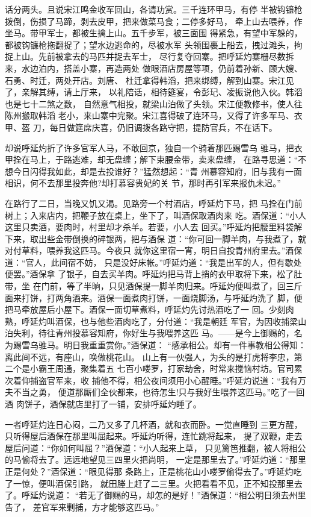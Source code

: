 话分两头。且说宋江鸣金收军回山，各请功赏。三千连环甲马，有停
半被钩镰枪拨倒，伤损了马蹄，剥去皮甲，把来做菜马食；二停多好马，
牵上山去喂养，作坐马。带甲军士，都被生擒上山。五千步军，被三面围
得紧急，有望中军躲的，都被钩镰枪拖翻捉了；望水边逃命的，尽被水军
头领围裹上船去，拽过滩头，拘捉上山。先前被拿去的马匹并捉去军士，
尽行复夺回寨。把呼延灼寨栅尽数拆来，水边泊内，搭盖小寨，再造两处
做眼酒店房屋等项，仍前着孙新、顾大嫂、石勇、时迁，两处开店。刘唐、
杜迁拿得韩滔，把来绑缚，解到山寨。宋江见了，亲解其缚，请上厅来，
以礼陪话，相待筵宴，令彭玘、凌振说他入伙。韩滔也是七十二煞之数，
自然意气相投，就梁山泊做了头领。宋江便教修书，使人往陈州搬取韩滔
老小，来山寨中完聚。宋江喜得破了连环马，又得了许多军马、衣甲、盔
刀，每日做筵席庆喜，仍旧调拨各路守把，提防官兵，不在话下。

却说呼延灼折了许多官军人马，不敢回京，独自一个骑着那匹踢雪乌
骓马，把衣甲拴在马上，于路逃难，却无盘缠；解下束腰金带，卖来盘缠，
在路寻思道：“不想今日闪得我如此，却是去投谁好？”猛然想起：“青
州慕容知府，旧与我有一面相识，何不去那里投奔他?却打慕容贵妃的关
节，那时再引军来报仇未迟。”

在路行了二日，当晚又饥又渴。见路旁一个村酒店，呼延灼下马，把
马拴在门前树上；入来店内，把鞭子放在桌上，坐下了，叫酒保取酒肉来
吃。酒保道：“小人这里只卖酒，要肉时，村里却才杀羊。若要，小人去
回买。”呼延灼把腰里料袋解下来，取出些金带倒换的碎银两，把与酒保
道：“你可回一脚羊肉，与我煮了，就对付草料，喂养我这匹马。今夜只
就你这里宿一宵，明日自投青州府里去。”酒保道：“官人，此间宿不妨，
只是没好床帐。”呼延灼道：“我是出军的人，但有歇处便罢。”酒保拿
了银子，自去买羊肉。呼延灼把马背上捎的衣甲取将下来，松了肚带，坐
在门前，等了半晌，只见酒保提一脚羊肉归来。呼延灼便叫煮了，回三斤
面来打饼，打两角酒来。酒保一面煮肉打饼，一面烧脚汤，与呼延灼洗了
脚，便把马牵放屋后小屋下。酒保一面切草煮料，呼延灼先讨热酒吃了一
回。少刻肉熟，呼延灼叫酒保，也与他些酒肉吃了，分付道：“我是朝廷
军官，为因收捕梁山泊失利，待往青州投慕容知府，你好生与我喂养这匹
马。——是今上御赐的，名为踢雪乌骓马。明日我重重赏你。”酒保道：
“感承相公。却有一件事教相公得知：离此间不远，有座山，唤做桃花山。
山上有一伙强人，为头的是打虎将李忠，第二个是小霸王周通，聚集着五
七百小喽罗，打家劫舍，时常来搅恼村坊。官司累次着仰捕盗官军来，收
捕他不得，相公夜间须用小心醒睡。”呼延灼说道：“我有万夫不当之勇，
便道那厮们全伙都来，也待怎生!只与我好生喂养这匹马。”吃了一回酒
肉饼子，酒保就店里打了一铺，安排呼延灼睡了。

一者呼延灼连日心闷，二乃又多了几杯酒，就和衣而卧。一觉直睡到
三更方醒，只听得屋后酒保在那里叫屈起来。呼延灼听得，连忙跳将起来，
提了双鞭，走去屋后问道：“你如何叫屈？”酒保道：“小人起来上草，
只见篱笆推翻，被人将相公的马偷将去了。远远地望见三四里火把尚明，
一定是那里去了。”呼延灼道：“那里正是何处？”酒保道：“眼见得那
条路上，正是桃花山小喽罗偷得去了。”呼延灼吃了一惊，便叫酒保引路，
就田塍上赶了二三里。火把看看不见，正不知投那里去了。呼延灼说道：
“若无了御赐的马，却怎的是好！”酒保道：“相公明日须去州里告了，
差官军来剿捕，方才能够这匹马。”

